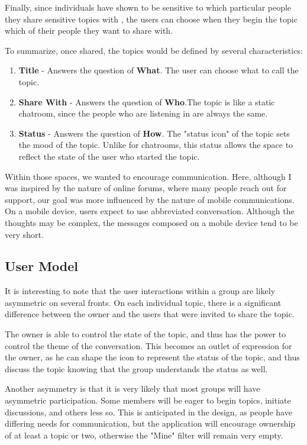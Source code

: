   Finally, since individuals have shown to be sensitive
  to which particular people they share
  sensitive topics with \cite{patil05},
  the users can choose when they begin the topic
  which of their people they want to share with.

  To summarize, once shared, the topics would be defined by several characteristics:

  \begin{enumerate}
  \item \textbf{Title} - Answers the question of \textbf{What}. The user can choose what to call the topic.
  \item \textbf{Share With} - Answers the question of \textbf{Who}.The topic is like a static chatroom,
    since the people who are listening in are always the same.
  \item \textbf{Status} - Answers the question of \textbf{How}. The "status icon" of the topic sets the mood
    of the topic. Unlike for chatrooms,
    this status allows the space to reflect the state
    of the user who started the topic.
  \end{enumerate}

  Within those spaces, we wanted to encourage communication.
  Here, although I was inspired by the nature of online forums,
  where many people reach out for support,
  our goal was more influenced by the nature of mobile communications.
  On a mobile device, users expect to use abbreviated conversation.
  Although the thoughts may be complex, the messages composed on a mobile device
  tend to be very short.

    \subsection{User Model}
      It is interesting to note that the user interactions within a group
      are likely asymmetric on several fronts.
      On each individual topic, there is a significant difference between the owner
      and the users that were invited to share the topic.

      The owner is able to control the state of the topic,
      and thus has the power to control the theme of the conversation.
      This becomes an outlet of expression for the owner,
      as he can shape the icon to represent the status of the topic,
      and thus discuss the topic knowing that the group understands the status as well.

      Another asymmetry is that it is very likely that most groups will
      have asymmetric participation.
      Some members will be eager to begin topics, initiate discussions,
      and others less so.
      This is anticipated in the design,
      as people have differing needs for communication,
      but the application will encourage ownership of at least a topic or two,
      otherwise the "Mine" filter will remain very empty.

